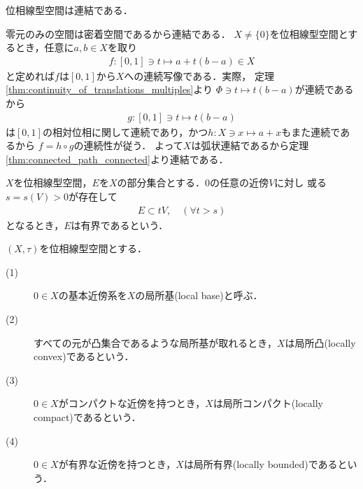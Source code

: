 	\begin{screen}
		\begin{thm}[位相線型空間の連結性]\label{thm:topological_vector_spaces_connected}
			位相線型空間は連結である．
		\end{thm}
	\end{screen}
	
	\begin{prf}
		零元のみの空間は密着空間であるから連結である．
		$X \neq \{0\}$を位相線型空間とするとき，任意に$a,b \in X$を取り
		\begin{align}
			f:[0,1] \ni t \longmapsto a + t(b - a) \in X
		\end{align}
		と定めれば$f$は$[0,1]$から$X$への連続写像である．実際，
		定理\ref{thm:continuity_of_translations_multiples}より
		$\Phi \ni t \longmapsto t(b-a)$が連続であるから
		\begin{align}
			g:[0,1] \ni t \longmapsto t(b-a)
		\end{align}
		は$[0,1]$の相対位相に関して連続であり，かつ$h:X \ni x \longmapsto a + x$もまた連続であるから
		$f = h \circ g$の連続性が従う．
		よって$X$は弧状連結であるから定理\ref{thm:connected_path_connected}より連結である．
		\QED
	\end{prf}
	
	\begin{screen}
		\begin{dfn}[位相線形空間の有界集合]\label{def:boundedness_in_tvs}
			$X$を位相線型空間，$E$を$X$の部分集合とする．0の任意の近傍$V$に対し
			或る$s = s(V) > 0$が存在して
			\begin{align}
				E \subset t V, \quad (\forall t > s)
			\end{align}
			となるとき，$E$は有界であるという．
		\end{dfn}
	\end{screen}
	
	\begin{screen}
		\begin{thm}
		\end{thm}
	\end{screen}
	
	\begin{screen}
		\begin{dfn}
			$(X,\tau)$を位相線型空間とする．
			\begin{description}
				\item[(1)] $0 \in X$の基本近傍系を$X$の局所基(local base)と呼ぶ．
				\item[(2)] すべての元が凸集合であるような局所基が取れるとき，$X$は局所凸(locally convex)であるという．
				\item[(3)] $0 \in X$がコンパクトな近傍を持つとき，$X$は局所コンパクト(locally compact)であるという．
				\item[(4)] $0 \in X$が有界な近傍を持つとき，$X$は局所有界(locally bounded)であるという．
			\end{description}
		\end{dfn}
	\end{screen}
	
